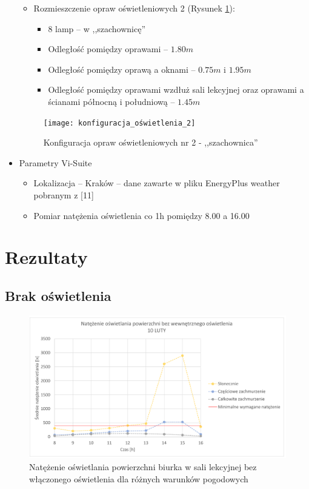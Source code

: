 \documentclass[a4paper,12pt]{article}
\begin{document}
\begin{itemize}
\begin{itemize}
				\item Rozmieszczenie opraw oświetleniowych 2 (Rysunek \ref{konfiguracja_opraw_2}):
			\begin{itemize}
				\item 8 lamp -- w ,,szachownicę''
				\item Odległość pomiędzy oprawami -- $1.80m$
				\item Odległość pomiędzy oprawą a oknami -- $0.75m$ i $1.95m$
				\item Odległość pomiędzy oprawami wzdłuż sali lekcyjnej oraz oprawami a ścianami północną i południową -- $1.45m$
			\end{itemize}	
		\end{itemize}
	
		\begin{figure}[h]
			\centering
			\texttt{[image: konfiguracja\_oświetlenia\_2]}
			\caption{Konfiguracja opraw oświetleniowych nr 2 - ,,szachownica''}
			\label{konfiguracja_opraw_2}
		\end{figure}
		
		\newpage
		\item Parametry Vi-Suite
		\begin{itemize}
			\item Lokalizacja -- Kraków -- dane zawarte w pliku EnergyPlus weather pobranym z [11]
			\item Pomiar natężenia oświetlenia co 1h pomiędzy 8.00 a 16.00
		\end{itemize}		
		
	\end{itemize}

	\section{Rezultaty}
	\label{sec:rezultaty}
	
	\subsection{Brak oświetlenia}
	\label{sec:brak_oswietlenia}
	
	\begin{figure}[h!]
		\centering
		\includegraphics[width=\linewidth]{Wykresy/bez_oswietlenia_1.pdf}
		\caption{Natężenie oświetlania powierzchni biurka w sali lekcyjnej bez włączonego oświetlenia dla różnych warunków pogodowych }
		\label{bez_oswietlenia_1}
	\end{figure}
\end{document}
